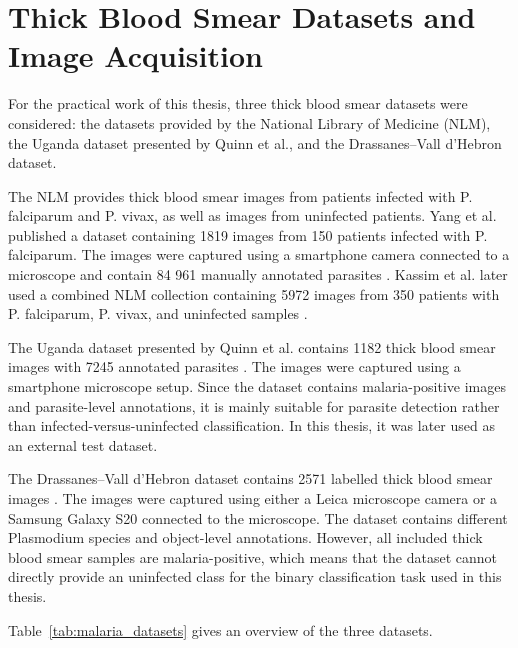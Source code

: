 \section{Thick Blood Smear Datasets and Image Acquisition}
\label{sec:datasets_acquisition}

For the practical work of this thesis, three thick blood smear datasets were considered: the datasets provided by the National Library of Medicine (NLM), the Uganda dataset presented by Quinn et al., and the Drassanes--Vall d'Hebron dataset.

The NLM provides thick blood smear images from patients infected with P. falciparum and P. vivax, as well as images from uninfected patients. Yang et al. published a dataset containing 1819 images from 150 patients infected with P. falciparum. The images were captured using a smartphone camera connected to a microscope and contain 84 961 manually annotated parasites \cite{Yang2020}. Kassim et al. later used a combined NLM collection containing 5972 images from 350 patients with P. falciparum, P. vivax, and uninfected samples \cite{Kassim2021}.

The Uganda dataset presented by Quinn et al. contains 1182 thick blood smear images with 7245 annotated parasites \cite{Quinn2016}. The images were captured using a smartphone microscope setup. Since the dataset contains malaria-positive images and parasite-level annotations, it is mainly suitable for parasite detection rather than infected-versus-uninfected classification. In this thesis, it was later used as an external test dataset.

The Drassanes--Vall d'Hebron dataset contains 2571 labelled thick blood smear images \cite{VallHebron2025}. The images were captured using either a Leica microscope camera or a Samsung Galaxy S20 connected to the microscope. The dataset contains different Plasmodium species and object-level annotations. However, all included thick blood smear samples are malaria-positive, which means that the dataset cannot directly provide an uninfected class for the binary classification task used in this thesis.

Table~\ref{tab:malaria_datasets} gives an overview of the three datasets.

